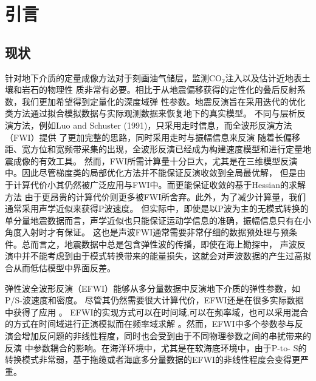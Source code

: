 



\chapter{引言}
\section{现状}
针对地下介质的定量成像方法对于刻画油气储层，监测CO$_2$注入以及估计近地表土壤和岩石的物理性
质非常有必要。相比于从地震偏移获得的定性化的叠后反射系数，我们更加希望得到定量化的深度域弹
性参数。地震反演旨在采用迭代的优化类方法通过拟合模拟数据与实际观测数据来恢复地下的真实模型。
不同与层析反演方法，例如Luo and Schuster (1991)\citep{luo1991}，只采用走时信息，而全波形反演方法（FWI）提供
了更加完整的思路，同时采用走时与振幅信息来反演\cite[]{tarantola:1986}
随着长偏移距、宽方位和宽频带采集的出现，全波形反演已经成为构建速度模型和进行定量地震成像的有效工具\cite{virieux2009overview}。
然而，FWI所需计算量十分巨大，尤其是在三维模型反演中。因此尽管梯度类的局部优化方法并不能保证反演收敛到全局最优解，
但是由于计算代价小其仍然被广泛应用与FWI中。而更能保证收敛的基于Hessian的求解方法\cite{mora:1987,crase1990robust}
由于更昂贵的计算代价则更多被FWI所舍弃。此外，为了减少计算量，我们通常采用声学近似来获得P波速度\cite{ravaut2004multiscale,operto2006crustal}。
但实际中，即使是以P波为主的无模式转换的单分量地震数据而言，声学近似也只能保证运动学信息的准确，振幅信息只有在小角度入射时才有保证。
这也是声波FWI通常需要非常仔细的数据预处理与预条件。总而言之，地震数据中总是包含弹性波的传播，即使在海上勘探中，
声波反演中并不能考虑到由于模式转换带来的能量损失，这就会对声波数据的产生过高拟合从而低估模型中界面反差。

弹性波全波形反演（EFWI）\cite{tarantola:1986}能够从多分量数据中反演地下介质的弹性参数，如P/S-波速度和密度。
尽管其仍然需要很大计算代价，EFWI还是在很多实际数据中获得了应用
\cite{crase1992nonlinear,djikpesse.tarantola:1999,sears:2008,sears:2010,prieux:2013a,prieux:2013b,vigh:2014}。
EFWI的实现方式可以在时间域\cite{shipp:2002},可以在频率域\cite{brossier2009}，也可以采用混合的方式在时间域进行正演模拟而在频率域求解
\cite{nihei.li:2007,sirgue:2008}。然而，EFWI中多个参数参与反演会增加反问题的非线性程度，同时也会受到由于不同物理参数之间的串扰带来的反演
中参数耦合的影响\cite{forgues.lambare:1997}。在海洋环境中，尤其是在软海底环境中，由于P-to-
S的转换模式非常弱，基于拖缆或者海底多分量数据的EFWI的非线性程度会变得更严重\cite{sears:2008}。

